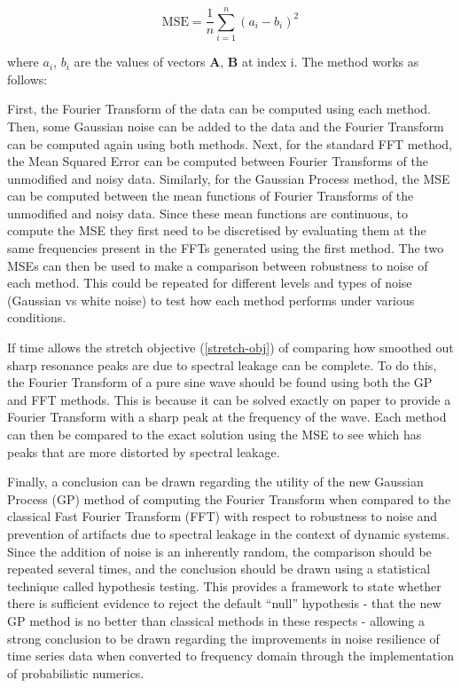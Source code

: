 \documentclass[12pt]{article}
\begin{document}
    \begin{equation}
        \text{MSE} = \frac{1}{n} \sum_{i=1}^{n} (a_i - b_i)^2
        \label{eq:mse}
    \end{equation}

    \noindent where $a_i$, $b_i$ are the values of vectors $\mathbf{A}$, $\mathbf{B}$ at index i.
    The method works as follows:

    First, the Fourier Transform of the data can be computed using each method.
    Then, some Gaussian noise can be added to the data and the Fourier Transform can be computed again using both methods.
    Next, for the standard FFT method, the Mean Squared Error can be computed between Fourier Transforms of the unmodified and noisy data.
    Similarly, for the Gaussian Process method, the MSE can be computed between the mean functions of Fourier Transforms of the unmodified and noisy data.
    Since these mean functions are continuous, to compute the MSE they first need to be discretised by evaluating them at the same frequencies present in the FFTs generated using the first method.
    The two MSEs can then be used to make a comparison between robustness to noise of each method.
    This could be repeated for different levels and types of noise (Gaussian vs white noise) to test how each method performs under various conditions.

    If time allows the stretch objective (\ref{stretch-obj}) of comparing how smoothed out sharp resonance peaks are due to spectral leakage can be complete.
    To do this, the Fourier Transform of a pure sine wave should be found using both the GP and FFT methods.
    This is because it can be solved exactly on paper to provide a Fourier Transform with a sharp peak at the frequency of the wave.
    Each method can then be compared to the exact solution using the MSE to see which has peaks that are more distorted by spectral leakage.

    Finally, a conclusion can be drawn regarding the utility of the new Gaussian Process (GP) method of computing the Fourier Transform when compared to the classical Fast Fourier Transform (FFT) with respect to robustness to noise and prevention of artifacts due to spectral leakage in the context of dynamic systems.
    Since the addition of noise is an inherently random, the comparison should be repeated several times, and the conclusion should be drawn using a statistical technique called hypothesis testing.
    This provides a framework to state whether there is sufficient evidence to reject the default ``null'' hypothesis - that the new GP method is no better than classical methods in these respects - allowing a strong conclusion to be drawn regarding the improvements in noise resilience of time series data when converted to frequency domain through the implementation of probabilistic numerics.
\end{document}
